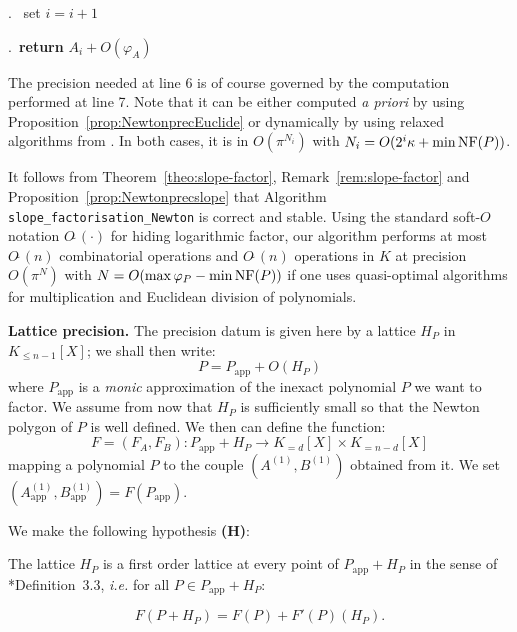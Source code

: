 \documentclass{sig-alternate-2013}
\newcommand{\softO}{O\tilde{~}}
\newcommand{\NF}{\text{\rm NF}}
\newcommand{\app}{\textrm{app}}
\begin{document}
\smallskip{}.\ \hspace{5mm}%
set $i = i+1$

\smallskip{}.\ 
{\bf return} $A_i + O(\varphi_A)$

\vspace{-1ex}\noindent\hrulefill

\begin{rem}
The precision needed at line 6 is of course governed by the computation
performed at line 7. Note that it can be either computed \emph{a
priori} by using Proposition~\ref{prop:NewtonprecEuclide} or dynamically 
by using relaxed algorithms from 
\cite{hoeven:02a,hoeven:07a,berthomieu-hoeven-lecerf:11a}. In both 
cases, it is in $O(\pi^{N_i})$ with $N_i = O(2^i \kappa + \min 
\NF(P))$.
\end{rem}

\noindent
It follows from Theorem~\ref{theo:slope-factor}, 
Remark~\ref{rem:slope-factor} and Proposition~\ref{prop:Newtonprecslope} 
that Algorithm {\tt slope\_factorisation\_Newton} is correct and 
stable. Using the standard soft-$O$ notation $\softO(\cdot)$ for
hiding logarithmic factor, our algorithm performs at most $\softO(n)$ 
combinatorial operations and $\softO(n)$ operations in $K$ at precision 
$O(\pi^N)$ with $N = O(\max \varphi_P - \min \NF(P))$ if one uses 
quasi-optimal algorithms for multiplication and Euclidean division of 
polynomials.


\medskip

\noindent
{\bf Lattice precision.}
The precision datum is given here by a lattice $H_P$ in $K_{\leq n{-}1}
[X]$; we shall then write:
$$P = P_\app + O(H_P)$$
where $P_\app$ is a \emph{monic} approximation of the inexact polynomial 
$P$ we want to factor. We assume from now that $H_P$ is sufficiently 
small so that the Newton polygon of $P$ is well defined. We then can
define the function:
$$F = (F_A, F_B) : P_\app + H_P \to K_{=d}[X] \times K_{=n{-}d}[X]$$
mapping a polynomial $P$ to the couple $(A^{(1)}, B^{(1)})$ obtained
from it. We set $(A_\app^{(1)}, B_\app^{(1)}) = F(P_\app)$.

\smallskip

\noindent
We make the following hypothesis \textbf{(H)}:

\smallskip

\noindent
\hfill
\begin{minipage}{8cm}
The lattice $H_P$ is a first order lattice at every point
of $P_\app + H_P$ in the sense of \cite{caruso-roe-vaccon:14a}*{Definition~3.3},
\emph{i.e.} for all $P \in P_\app + H_P$:

\vspace{-5mm}

$$F(P + H_P) = F(P) + F'(P)(H_P).$$
\end{minipage}
\hfill \null
\end{document}
